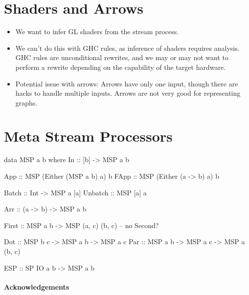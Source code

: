\documentclass[preprint]{sigplanconf}
\begin{document}
\section{Shaders and Arrows}
\begin{itemize}
\item	We want to infer GL shaders from the stream process.

\item	We can't do this with GHC rules, as inference of shaders requires analysis. GHC rules are unconditional rewrites, and we may or may not want to perform a rewrite depending on the capability of the target hardware.

\item	Potential issue with arrows: Arrows have only one input, though there are hacks to handle multiple inputs. Arrows are not very good for representing graphs.

\end{itemize}

\clearpage{}
\section{Meta Stream Processors}
\begin{code}
data MSP a b where
  In         :: [b] -> MSP a b

  App        :: MSP (Either (MSP a b) a) b
  FApp       :: MSP (Either (a -> b) a)  b

  Batch      :: Int -> MSP a [a]
  Unbatch    :: MSP [a] a

  Arr        :: (a -> b) -> MSP a b

  First      :: MSP a b -> MSP (a, c) (b, c)
  -- no Second?

  Dot        :: MSP b c -> MSP a b -> MSP a c
  Par        :: MSP a b -> MSP a c -> MSP a (b, c)
  
  ESP        :: SP IO a b -> MSP a b 
\end{code}

\paragraph{Acknowledgements}


\end{document}
